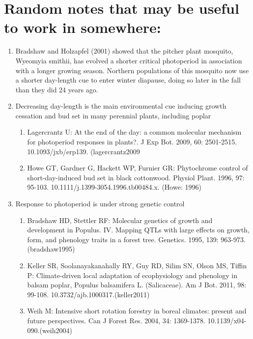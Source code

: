 \documentclass{article}
\begin{document}
\section* {Random notes that may be useful to work in somewhere:}
\begin {enumerate}
\item Bradshaw and Holzapfel (2001) showed that the pitcher plant mosquito,
Wyeomyia smithii, has evolved a shorter critical photoperiod in association with a
longer growing season. Northern populations of this mosquito now use a shorter
day-length cue to enter winter diapause, doing so later in the fall than they did
24 years ago.
\item Decreasing day-length is the main environmental cue inducing growth cessation and bud set in many perennial plants, including poplar 
\begin{enumerate}

\item Lagercrantz U: At the end of the day: a common molecular mechanism for photoperiod responses in plants?. J Exp Bot. 2009, 60: 2501-2515. 10.1093/jxb/erp139. (lagercrantz2009
\item Howe GT, Gardner G, Hackett WP, Furnier GR: Phytochrome control of short-day-induced bud set in black cottonwood. Physiol Plant. 1996, 97: 95-103. 10.1111/j.1399-3054.1996.tb00484.x. (Howe: 1996)
\end{enumerate}

\item Response to photoperiod is under strong genetic control %
\begin{enumerate}
\item Bradshaw HD, Stettler RF: Molecular genetics of growth and development in Populus. IV. Mapping QTLs with large effects on growth, form, and phenology traits in a forest tree. Genetics. 1995, 139: 963-973. (bradshaw1995)
\item Keller SR, Soolanayakanahally RY, Guy RD, Silim SN, Olson MS, Tiffin P: Climate-driven local adaptation of ecophysiology and phenology in balsam poplar, Populus balsamifera L. (Salicaceae). Am J Bot. 2011, 98: 99-108. 10.3732/ajb.1000317.(keller2011)
\item Weih M: Intensive short rotation forestry in boreal climates: present and future perspectives. Can J Forest Res. 2004, 34: 1369-1378. 10.1139/x04-090.(weih2004)
\end{enumerate}
\end {enumerate}

\clearpage
\end{document}
